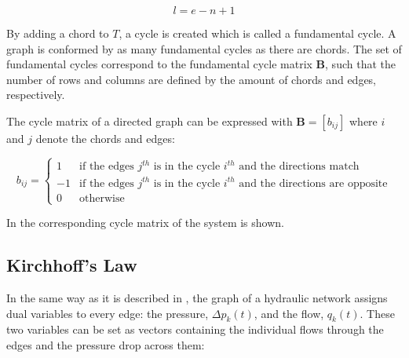 \begin{equation}
  \label{Numberofchords}
  l = e - n +1
\end{equation}

By adding a chord to $T$, a cycle is created which is called a fundamental cycle. A graph is conformed by as many fundamental cycles as there are chords\cite{GraphModel}.  
The set of fundamental cycles correspond to the fundamental cycle matrix $\bm{B}$, such that the number of rows and columns are defined by the amount of chords and edges, respectively. 

The cycle matrix of a directed graph can be expressed with $\bm{B} = [b_{ij}]$ where $i$ and $j$ denote the chords and edges:

\begin{equation}
\label{DiGraphCycle}
 b_{ij} =
		\left\{
		\begin{array}{ll}
		
		1 			&      \text{if the edges $j^{th}$ is in the cycle $i^{th}$ and the directions match}	
\\
		-1                       &     \text{if the edges $j^{th}$ is in the cycle $i^{th}$ and the directions are opposite}
\\

                0                       &      \text{otherwise}

		\end{array}
		\right.
\end{equation}	

In  the corresponding cycle matrix of the system is 
shown.

\subsection*{Kirchhoff's Law}
\label{KirchhoffSection}

In the same way as it is described in , the graph of a hydraulic network assigns dual variables to every edge: 
the pressure, $\Delta p_k(t)$, and the flow, $q_k(t)$. These two variables can be set as vectors containing the individual flows through the edges and the pressure drop across them:


